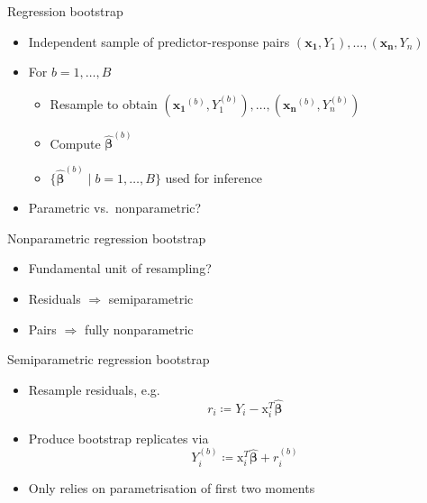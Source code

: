 \documentclass[tikz]{beamer}
\begin{document}
\begin{frame}{Regression bootstrap}
  \begin{itemize}
    \item Independent sample of predictor-response pairs $(\mathbf{x_1}, Y_1), \dots, (\mathbf{x_n}, Y_n)$
    \item For $b = 1, \dots, B$
          \begin{itemize}
            \item Resample to obtain $(\mathbf{x_1}^{(b)}, Y_1^{(b)}), \dots, (\mathbf{x_n}^{(b)}, Y_n^{(b)})$
            \item Compute $\widehat{\bm{\beta}}^{(b)}$
            \item $\{ \widehat{\bm{\beta}}^{(b)} \mid b = 1, \dots, B \}$ used for inference
          \end{itemize}
    \item Parametric vs.\ nonparametric?
  \end{itemize}
\end{frame}

\begin{frame}{Nonparametric regression bootstrap}
  \begin{itemize}
    \item Fundamental unit of resampling?
    \item Residuals $\Rightarrow$ semiparametric
    \item Pairs $\Rightarrow$ fully nonparametric
  \end{itemize}
\end{frame}

\begin{frame}{Semiparametric regression bootstrap}
  \begin{itemize}
    \item Resample residuals, e.g.
          \begin{equation*}
            r_i \coloneqq Y_i - \bm{\mathrm{x}}^T_i \widehat{\bm{\beta}}
          \end{equation*}
    \item Produce bootstrap replicates via
          \begin{equation*}
            Y_i^{(b)} \coloneqq \bm{\mathrm{x}}^T_i \widehat{\bm{\beta}} + r^{(b)}_i
          \end{equation*}
    \item Only relies on parametrisation of first two moments
  \end{itemize}
\end{frame}
\end{document}

